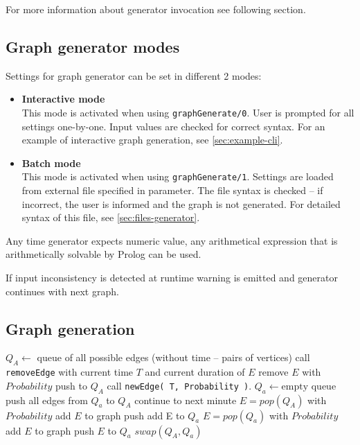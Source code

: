 \documentclass[11pt, a4paper,draft]{article}
\newcommand{\pl}[1]{\texttt{#1}} %
\theoremstyle{plain}
\theoremstyle{definition}
\theoremstyle{remark}
\begin{document}
For more information about generator invocation see following section.

\subsection{Graph generator modes}
\label{sec:generator-modes}
Settings for graph generator can be set in different 2 modes:
\begin{itemize}
\item \textbf{Interactive mode} \\
This mode is activated when using \pl{graphGenerate/0}. 
User is prompted for all settings one-by-one. Input values are checked for correct syntax. 
For an example of interactive graph generation, see \autoref{sec:example-cli}.
\item \textbf{Batch mode} \\
This mode is activated when using \pl{graphGenerate/1}. 
Settings are loaded from external file specified in parameter. 
The file syntax is checked -- if incorrect, the user is informed and the graph is not generated. 
For detailed syntax of this file, see \autoref{sec:files-generator}.
\end{itemize}

Any time generator expects numeric value, any arithmetical expression
that is arithmetically solvable by Prolog can be used.

If input inconsistency is detected at runtime warning is emitted and generator
continues with next graph.

\subsection{Graph generation}
\label{sec:generator-generation}

\begin{algorithmic}[1]
    \State $Q_A \leftarrow$ queue of all possible edges (without time -- pairs of vertices)
            \State call \pl{removeEdge} with current time $T$ and current duration of $E$
            \State remove $E$ with $Probability$
             push to $Q_A$ \EndIf
        \EndFor
        \State call \pl{newEdge( T, Probability )}.
        \State $Q_a \leftarrow \text{empty queue}$
                \State push all edges from $Q_a$ to $Q_A$
                \State continue to next minute
            \EndIf
            \State $E = pop( Q_A )$
            \State with $Probability$ add $E$ to graph
             push add E to $Q_a$ \EndIf
                    \State $E = pop( Q_a )$
                    \State with $Probability$ add $E$ to graph
                     push $E$ to $Q_a$ \EndIf
                \EndWhile
            \EndIf
        \EndWhile
        \State $swap( Q_A, Q_a )$ 
    \EndFor
\end{algorithmic}
\end{document}
